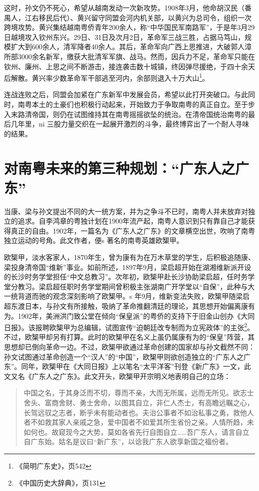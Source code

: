 这时，孙文仍不死心，希望从越南发动一次新攻势。1908年3月，他命胡汉民（番禺人，江右移民后代）、黄兴留守同盟会河内机关部，以黄兴为总司令，组织一次跨境攻势。黄兴集结越南粤侨青年200余人，称“中华国民军南路军”，于是年3月29日越境攻入钦州东兴。29日、31日及次月2日，革命军三战三胜，占据马笃山，规模扩大到600余人，清军降者40余人。其后，革命军向广西上思推进，大破郭人漳所部3000余名新军，缴获大批清军军旗、战马。然而，因兵力不足，革命军只能在钦州、廉州、上思之间不断游击，接连袭击数十城镇，终因弹尽援绝，于四十余天后解散。黄兴率少数革命军干部逃至河内，余部则退入十万大山\footnote{《简明广东史》，页542}。

连战连败之后，同盟会加紧在广东新军中发展会员，希望以此打开突破口。与此同时，南粤本土的土豪们也积极行动起来，开始致力于争取南粤的真正自立。至于步入末路清帝国，则仍在试图维持其在南粤摇摇欲坠的统治。在清帝国统治南粤的最后几年里，ni 三股力量交织在一起展开激烈的斗争，最终博弈出了一个耐人寻味的结果。

\section{对南粤未来的第三种规划：“广东人之广东”}


当康、梁与孙文提出不同的大一统方案，并为之争斗不已时，南粤人并未放弃对独立的追求。自李鸿章的粤独计划在1900年流产起，南粤人意识到只有靠自己才能获得真正的自由。1902年，一篇名为《广东人之广东》的文章横空出世，吹响了南粤独立运动的号角。此文作者，便s 著名的南粤英雄欧榘甲。

欧榘甲，淡水客家人，1870年生，曾为康有为在万木草堂的学生，后积极追随康、梁投身清帝国“维新”事业。如前所述，1897年9月，梁启超开始在湖湘维新派开设的长沙时务学堂担任“中文总教习”。次年初，欧榘甲赴长沙协助梁启超，任时务学堂分教习。梁启超任职时务学堂期间曾积极主张湖南广开学堂以“自保”，此种与大一统背道而驰的观念深刻影响了欧榘甲。s 年9月，维新变法失败，欧榘甲随梁启超东渡日本，与孙文有所接触，吸纳了革命推翻清廷的理论，其思想开始偏离康有为。1902年，美洲洪门致公堂在倾向“保皇派”的粤侨的支持下于旧金山创办《大同日报》。该报聘欧榘甲为总编辑，试图宣传“迫朝廷改专制而为立宪政体”的主张\footnote{《中国历史大辞典》，页131}。不过，欧榘甲却另有打算。此时的欧榘甲在名义上虽仍属康有为的“保皇”阵营，其思想却已倒向革命一边。不过，欧榘甲欲通过革命创建的国家却与孙文截然不同：孙文试图通过革命创造一个“汉人”的“中国”，欧榘甲则欲创造独立的“广东人之广东”。同年，欧榘甲在《大同日报》上以笔名“太平洋客”刊登《新广东》一文，此文又名《广东人之广东》。此文开头，欧榘甲开宗明义地表明自己的立场：

\begin{quote}

中国之名，于其身泛而不切，尊而不亲，大而无所属，远而无所见。欲志士舍头、富商舍财、勇士舍命，以图其自立，非仁人杰士，有高瞻远瞩之心，长驾远驭之志者，断乎未有能动者也。夫治公事者不如治私事之勇，救他人 者不如救其家人亲戚之急，爱中国者不如爱其所生省份之亲。人情所趋，未如何也。故窥现今之大势，莫如各省先行自图自立……吾广东人，请言自立自广东始。姑名是议曰“新广东”，以谂我广东人欲享新国之福份者。
\end{quote}

